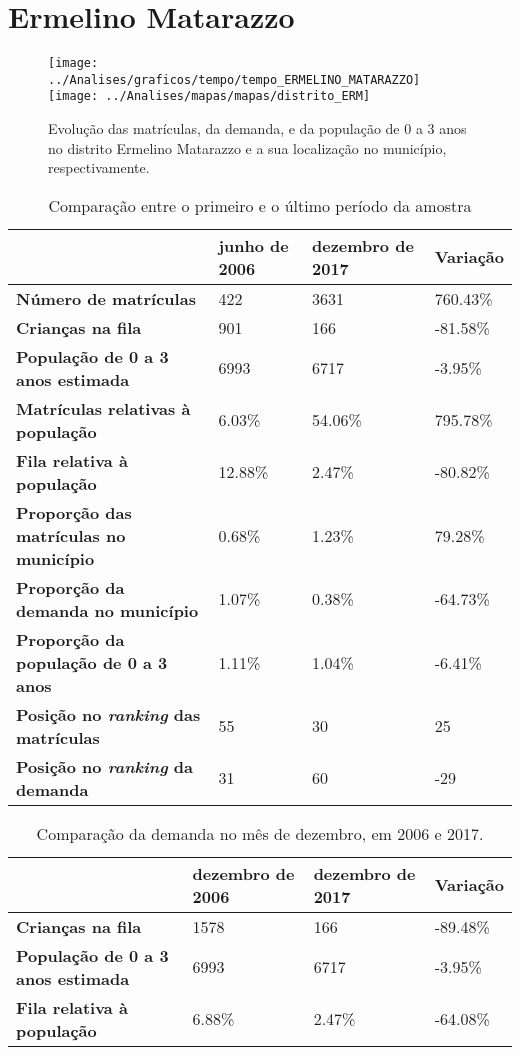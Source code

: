 \section{Ermelino Matarazzo}
\begin{figure}[H]
	\centering
	\texttt{[image: ../Analises/graficos/tempo/tempo\_ERMELINO\_MATARAZZO]}
	\texttt{[image: ../Analises/mapas/mapas/distrito\_ERM]}
	\caption{Evolução das matrículas, da demanda, e da população de 0 a 3 anos no distrito Ermelino Matarazzo e a sua localização no município, respectivamente.}
\end{figure}
\begin{table}[H]
	\begin{tabular}{|l|l|l|l|}
		\hline
		\textbf{}                                      & \textbf{junho de 2006}       & \textbf{dezembro de 2017}    & \textbf{Variação} \\ \hline
		\textbf{Número de matrículas}                  & 422 & 3631 & 760.43\% \\ \hline
		\textbf{Crianças na fila}                      & 901 & 166 & -81.58\% \\ \hline
		\textbf{População de 0 a 3 anos estimada}      & 6993 & 6717 & -3.95\% \\ \hline
		\textbf{Matrículas relativas à população}      & 6.03\% & 54.06\% & 795.78\% \\ \hline
		\textbf{Fila relativa à população}             & 12.88\% & 2.47\% & -80.82\% \\ \hline
		\textbf{Proporção das matrículas no município} & 0.68\% & 1.23\% & 79.28\% \\ \hline
		\textbf{Proporção da demanda no município}     & 1.07\% & 0.38\% & -64.73\% \\ \hline
		\textbf{Proporção da população de 0 a 3 anos}  & 1.11\% & 1.04\% & -6.41\% \\ \hline
		\textbf{Posição no \textit{ranking} das matrículas}     & 55 & 30 & 25 \\ \hline
		\textbf{Posição no \textit{ranking} da demanda}         & 31 & 60 & -29 \\ \hline
	\end{tabular}
	\caption{Comparação entre o primeiro e o último período da amostra}
\end{table}
\begin{table}[H]
	\begin{tabular}{|l|l|l|l|}
		\hline
		\textbf{}                                 & \textbf{dezembro de 2006} & \textbf{dezembro de 2017} & \textbf{Variação} \\ \hline
		\textbf{Crianças na fila}                      & 1578 & 166 & -89.48\% \\ \hline
		\textbf{População de 0 a 3 anos estimada}      & 6993 & 6717 & -3.95\% \\ \hline
		\textbf{Fila relativa à população}             & 6.88\% & 2.47\% & -64.08\% \\ \hline
	\end{tabular}
	\caption{Comparação da demanda no mês de dezembro, em 2006 e 2017.}
\end{table}
